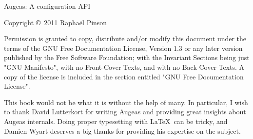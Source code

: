 \cleardoublepage
Augeas: A configuration API

Copyright \copyright~2011 Raphaël Pinson

Permission is granted to copy, distribute and/or modify this document under the terms of the GNU Free Documentation License, Version 1.3 or any later version published by the Free Software Foundation; with the Invariant Sections being just "GNU Manifesto", with no Front-Cover Texts, and with no Back-Cover Texts.  A copy of the license is included in the section entitled "GNU Free Documentation License".

This book would not be what it is without the help of many.
In particular, I wish to thank David Lutterkort for writing Augeas and providing great insights about Augeas internals.
Doing proper typesetting with \LaTeX~can be tricky, and Damien Wyart deserves a big thanks for providing his expertise on the subject.

